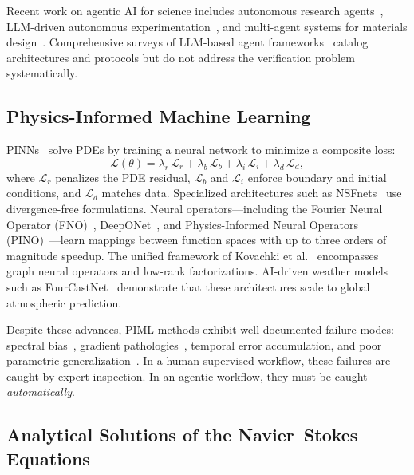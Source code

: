 \documentclass[conference]{IEEEtran}
\begin{document}
Recent work on agentic AI for science includes autonomous research agents~\cite{AIScientist2024}, LLM-driven autonomous experimentation~\cite{Boiko2023}, and multi-agent systems for materials design~\cite{MatAgent2024}. Comprehensive surveys of LLM-based agent frameworks~\cite{Ferrag2025,Wang2024agents} catalog architectures and protocols but do not address the verification problem systematically.

\subsection{Physics-Informed Machine Learning}

PINNs~\cite{Raissi2019} solve PDEs by training a neural network to minimize a composite loss:
\begin{equation}\label{eq:PINN-loss}
  \mathcal{L}(\theta) = \lambda_r\,\mathcal{L}_r + \lambda_b\,\mathcal{L}_b
    + \lambda_i\,\mathcal{L}_i + \lambda_d\,\mathcal{L}_d,
\end{equation}
where $\mathcal{L}_r$ penalizes the PDE residual, $\mathcal{L}_b$ and $\mathcal{L}_i$ enforce boundary and initial conditions, and $\mathcal{L}_d$ matches data. Specialized architectures such as NSFnets~\cite{Park2021} use divergence-free formulations. Neural operators---including the Fourier Neural Operator (FNO)~\cite{Li2021FNO}, DeepONet~\cite{Lu2021}, and Physics-Informed Neural Operators (PINO)~\cite{Li2023PINO}---learn mappings between function spaces with up to three orders of magnitude speedup. The unified framework of Kovachki et al.~\cite{Kovachki2023} encompasses graph neural operators and low-rank factorizations. AI-driven weather models such as FourCastNet~\cite{Pathak2022} demonstrate that these architectures scale to global atmospheric prediction.

Despite these advances, PIML methods exhibit well-documented failure modes: spectral bias~\cite{Rahaman2019}, gradient pathologies~\cite{Wang2021}, temporal error accumulation, and poor parametric generalization~\cite{Hao2024}. In a human-supervised workflow, these failures are caught by expert inspection. In an agentic workflow, they must be caught \emph{automatically}.

\subsection{Analytical Solutions of the Navier--Stokes Equations}
\end{document}
